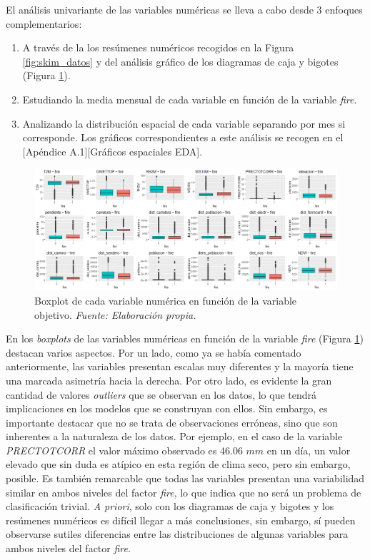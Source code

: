 \documentclass[12pt,a4paper,]{book}
\numberwithin{dummy}{section}
\theoremstyle{ocrenumbox}
\theoremstyle{blacknumex}
\theoremstyle{blacknumbox}
\theoremstyle{ocrenum}
\theoremstyle{ocrenum}
\begin{document}
El análisis univariante de las variables numéricas se lleva a cabo desde
3 enfoques complementarios:

\begin{enumerate}
\def\labelenumi{\arabic{enumi}.}
\item
  A través de la los resúmenes numéricos recogidos en la Figura
  \ref{fig:skim_datos} y del análisis gráfico de los diagramas de caja y
  bigotes (Figura \ref{fig:boxplots}).
\item
  Estudiando la media mensual de cada variable en función de la variable
  \emph{fire}.
\item
  Analizando la distribución espacial de cada variable separando por mes
  si corresponde. Los gráficos correspondientes a este análisis se
  recogen en el {[}Apéndice A.1{]}{[}Gráficos espaciales EDA{]}.
\end{enumerate}

\begin{figure}[]
\centering
\includegraphics[width =\textwidth]{graficos/boxplots.png}
\caption[Diagrama de caja y bigotes de cada variable numérica en función de la variable objetivo]{Boxplot de cada variable numérica en función de la variable objetivo. \it Fuente: Elaboración propia.}
\label{fig:boxplots}
\end{figure}

En los \emph{boxplots} de las variables numéricas en función de la
variable \emph{fire} (Figura \ref{fig:boxplots}) destacan varios
aspectos. Por un lado, como ya se había comentado anteriormente, las
variables presentan escalas muy diferentes y la mayoría tiene una
marcada asimetría hacia la derecha. Por otro lado, es evidente la gran
cantidad de valores \emph{outliers} que se observan en los datos, lo que
tendrá implicaciones en los modelos que se construyan con ellos. Sin
embargo, es importante destacar que no se trata de observaciones
erróneas, sino que son inherentes a la naturaleza de los datos. Por
ejemplo, en el caso de la variable \emph{PRECTOTCORR} el valor máximo
observado es 46.06 \(mm\) en un día, un valor elevado que sin duda es
atípico en esta región de clima seco, pero sin embargo, posible. Es
también remarcable que todas las variables presentan una variabilidad
similar en ambos niveles del factor \emph{fire}, lo que indica que no
será un problema de clasificación trivial. \emph{A priori}, solo con los
diagramas de caja y bigotes y los resúmenes numéricos es difícil llegar
a más conclusiones, sin embargo, sí pueden observarse sutiles
diferencias entre las distribuciones de algunas variables para ambos
niveles del factor \emph{fire}.
\end{document}
